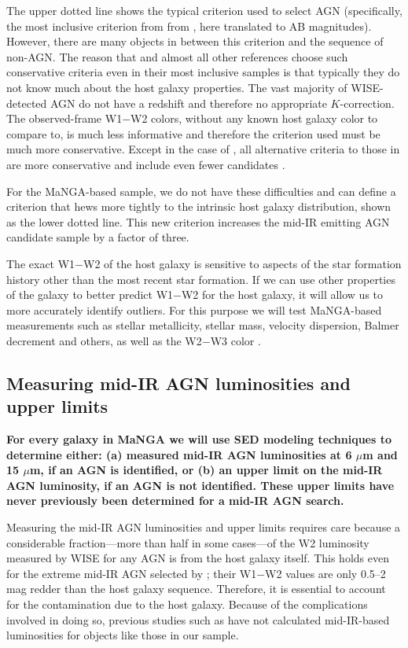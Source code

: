 \documentclass[12pt, preprint]{hacked-aastex}
\begin{document}
The upper dotted line shows the typical criterion used to select AGN
(specifically, the most inclusive criterion from from \cite{assef18a},
here translated to AB magnitudes). However, there are many objects in
between this criterion and the sequence of non-AGN. The reason that
\cite{assef18a} and almost all other references choose such
conservative criteria even in their most inclusive samples is that
typically they do not know much about the host galaxy properties.  The
vast majority of WISE-detected AGN do not have a redshift and
therefore no appropriate $K$-correction. The observed-frame W1$-$W2
colors, without any known host galaxy color to compare to, is much
less informative and therefore the criterion used must be much more
conservative. Except in the case of \cite{hviding22a}, all alternative
criteria to those in \cite{assef18a} are more conservative and include
even fewer candidates \cite{jarrett11a,stern12a}.

For the MaNGA-based sample, we do not have these difficulties and can
define a criterion that hews more tightly to the intrinsic host galaxy
distribution, shown as the lower dotted line. This new criterion
increases the mid-IR emitting AGN candidate sample by a factor of
three.

The exact W1$-$W2 of the host galaxy is sensitive to aspects of the
star formation history other than the most recent star formation. If
we can use other properties of the galaxy to better predict W1$-$W2
for the host galaxy, it will allow us to more accurately identify
outliers.  For this purpose we will test MaNGA-based measurements such
as stellar metallicity, stellar mass, velocity dispersion, Balmer
decrement and others, as well as the W2$-$W3 color \cite{hviding22a}.

\subsection{Measuring mid-IR AGN luminosities and upper limits}
\label{sec:measurements}

{\bf For every galaxy in MaNGA we will use SED modeling techniques to
  determine either: (a) measured mid-IR AGN luminosities at 6 $\mu$m
  and 15 $\mu$m, if an AGN is identified, or (b) an upper limit on the
  mid-IR AGN luminosity, if an AGN is not identified.  These upper
  limits have never previously been determined for a mid-IR AGN
  search.}

Measuring the mid-IR AGN luminosities and upper limits requires care
because a considerable fraction---more than half in some cases---of
the W2 luminosity measured by WISE for any AGN is from the host galaxy
itself.  This holds even for the extreme mid-IR AGN selected by
\cite{assef18a}; their W1$-$W2 values are only 0.5--2 mag redder than
the host galaxy sequence.  Therefore, it is essential to account for
the contamination due to the host galaxy. Because of the complications
involved in doing so, previous studies such as \cite{hviding22a}
have not calculated mid-IR-based luminosities for objects like those
in our sample.
\end{document}
